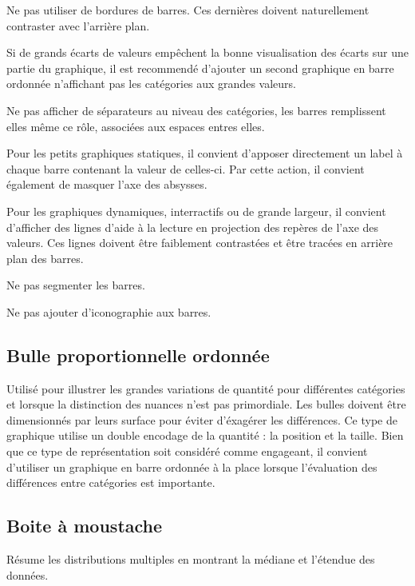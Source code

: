 \documentclass[a4paper,12pt]{article}
\begin{document}
\begin{multicols}{2}
Ne pas utiliser de bordures de barres. Ces dernières doivent naturellement contraster avec l'arrière plan.

Si de grands écarts de valeurs empêchent la bonne visualisation des écarts sur une partie du graphique, il est recommendé d'ajouter un second graphique en barre ordonnée n'affichant pas les catégories aux grandes valeurs. \autocite{jonathanschwabishComparingCategories2021}

Ne pas afficher de séparateurs au niveau des catégories, les barres remplissent elles même ce rôle, associées aux espaces entres elles. \autocite{jonathanschwabishComparingCategories2021}

Pour les petits graphiques statiques, il convient d'apposer directement un label à chaque barre contenant la valeur de celles-ci. Par cette action, il convient également de masquer l'axe des absysses. \autocite{jonathanschwabishComparingCategories2021}

Pour les graphiques dynamiques, interractifs ou de grande largeur, il convient d'afficher des lignes d'aide à la lecture en projection des repères de l'axe des valeurs. Ces lignes doivent être faiblement contrastées et être tracées en arrière plan des barres. \autocite{jonathanschwabishComparingCategories2021}

Ne pas segmenter les barres. \autocite{jonathanschwabishComparingCategories2021}

Ne pas ajouter d'iconographie aux barres. \autocite{tranDiscoveringAccessibleData2024}
\subsection*{Bulle proportionnelle ordonnée}
\label{sec:orgf017a70}
Utilisé pour illustrer les grandes variations de quantité pour différentes catégories et lorsque la distinction des nuances n'est pas primordiale. Les bulles doivent être dimensionnés par leurs surface pour éviter d'éxagérer les différences. \autocite{jonathanschwabishComparingCategories2021} Ce type de graphique utilise un double encodage de la quantité : la position et la taille. \autocite{wilkeVisualizingAssociationsTwo2019} Bien que ce type de représentation soit considéré comme engageant, il convient d'utiliser un graphique en barre ordonnée à la place lorsque l'évaluation des différences entre catégories est importante. \autocite{jonathanschwabishComparingCategories2021}
\subsection*{Boite à moustache}
\label{sec:org4023025}
Résume les distributions multiples en montrant la médiane et l'étendue des données. \autocite{alansmithLexiqueVisuel}


\end{multicols}
\end{document}
